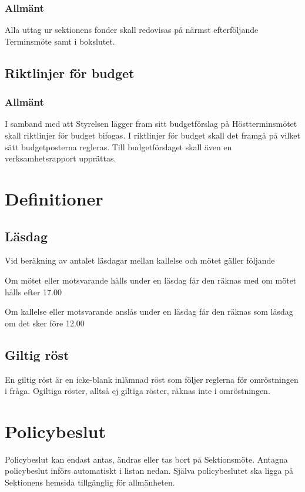 \documentclass[10pt]{article}
\renewcommand{\thesubsection}{\arabic{section}:\Alph{subsection}}
\begin{document}
\subsubsection{Allmänt}

Alla uttag ur sektionens fonder skall redovisas på närmst efterföljande
Terminsmöte samt i bokslutet.

\subsection{Riktlinjer för budget}

\subsubsection{Allmänt}

I samband med att Styrelsen lägger fram sitt budgetförslag på Höstterminsmötet skall riktlinjer för budget bifogas. I riktlinjer för budget skall det framgå
på vilket sätt budgetposterna regleras. Till budgetförslaget skall även en verksamhetsrapport upprättas.

\renewcommand*\thesubsection{\arabic{section}:\Alph{subsection}}
\section{Definitioner}

\subsection{Läsdag}
Vid beräkning av antalet läsdagar mellan kallelse och mötet gäller följande
\begin{emptylist}
\item Om mötet eller motsvarande hålls under en läsdag får den räknas med om
    mötet hålls efter 17.00
\item Om kallelse eller motsvarande anslås under en läsdag får den räknas som
    läsdag om det sker före 12.00
\end{emptylist}

\subsection{Giltig röst}
En giltig röst är en icke-blank inlämnad röst som följer reglerna för omröstningen i fråga. Ogiltiga röster, alltså ej giltiga röster, räknas inte i omröstningen.
\newpage

\section{Policybeslut}
Policybeslut kan endast antas, ändras eller tas bort på Sektionsmöte. Antagna policybeslut införs automatiskt i listan nedan. Själva policybeslutet ska ligga på Sektionens hemsida tillgänglig för allmänheten.
\end{document}
